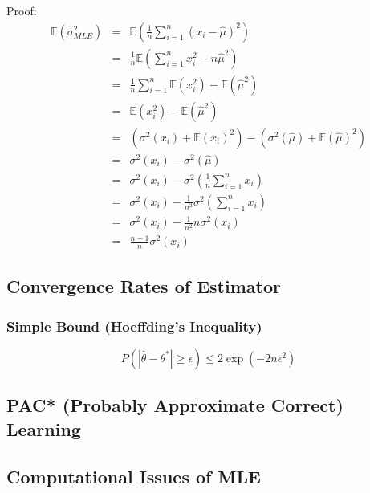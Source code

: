 \documentclass[letterpaper, 10pt, twocolumn]{article}
\begin{document}
Proof:
\begin{equation}
\begin{array}{rcl}
\mathbb{E}(\sigma^2_{MLE}) & = & \mathbb{E}(\frac{1}{n}\sum_{i=1}^{n}{(x_i-\hat{\mu})^2}) \\
& = & \frac{1}{n}\mathbb{E}(\sum_{i=1}^{n}{x_i^2}-n\hat{\mu}^2) \\
& = & \frac{1}{n}\sum_{i=1}^{n}{\mathbb{E}(x_i^2)-\mathbb{E}(\hat{\mu}^2)}\\
& = & \mathbb{E}(x_i^2)-\mathbb{E}(\hat{\mu}^2) \\
& = & (\sigma^2(x_i)+\mathbb{E}(x_i)^2)-(\sigma^2(\hat{\mu})+\mathbb{E}(\hat{\mu})^2) \\
& = & \sigma^2(x_i) - \sigma^2(\hat{\mu}) \\
& = & \sigma^2(x_i) - \sigma^2(\frac{1}{n}\sum_{i=1}^{n}{x_i}) \\
& = & \sigma^2(x_i) - \frac{1}{n^2}\sigma^2(\sum_{i=1}^{n}{x_i}) \\
& = & \sigma^2(x_i) - \frac{1}{n^2}n\sigma^2(x_i) \\
& = & \frac{n-1}{n}\sigma^2(x_i)
\end{array}
\end{equation}

\subsection{Convergence Rates of Estimator}

\subsubsection{Simple Bound (Hoeffding's Inequality)}

$$P(|\hat{\theta}-\theta^*|\geq \epsilon) \leq 2\exp(-2n\epsilon^2)$$

\subsection{PAC* (Probably Approximate Correct) Learning}

\subsection{Computational Issues of MLE}
\end{document}
